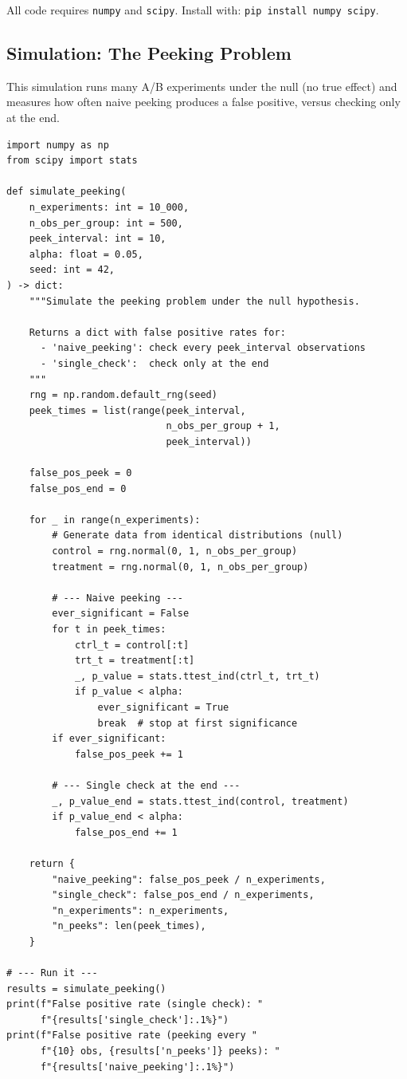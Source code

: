 \documentclass[12pt, a4paper]{article}
\begin{document}
All code requires \texttt{numpy} and \texttt{scipy}.  Install with:
\texttt{pip install numpy scipy}.


\subsection{Simulation: The Peeking Problem}

This simulation runs many A/B experiments under the null (no true effect)
and measures how often naive peeking produces a false positive, versus
checking only at the end.

\begin{lstlisting}
import numpy as np
from scipy import stats

def simulate_peeking(
    n_experiments: int = 10_000,
    n_obs_per_group: int = 500,
    peek_interval: int = 10,
    alpha: float = 0.05,
    seed: int = 42,
) -> dict:
    """Simulate the peeking problem under the null hypothesis.

    Returns a dict with false positive rates for:
      - 'naive_peeking': check every peek_interval observations
      - 'single_check':  check only at the end
    """
    rng = np.random.default_rng(seed)
    peek_times = list(range(peek_interval,
                            n_obs_per_group + 1,
                            peek_interval))

    false_pos_peek = 0
    false_pos_end = 0

    for _ in range(n_experiments):
        # Generate data from identical distributions (null)
        control = rng.normal(0, 1, n_obs_per_group)
        treatment = rng.normal(0, 1, n_obs_per_group)

        # --- Naive peeking ---
        ever_significant = False
        for t in peek_times:
            ctrl_t = control[:t]
            trt_t = treatment[:t]
            _, p_value = stats.ttest_ind(ctrl_t, trt_t)
            if p_value < alpha:
                ever_significant = True
                break  # stop at first significance
        if ever_significant:
            false_pos_peek += 1

        # --- Single check at the end ---
        _, p_value_end = stats.ttest_ind(control, treatment)
        if p_value_end < alpha:
            false_pos_end += 1

    return {
        "naive_peeking": false_pos_peek / n_experiments,
        "single_check": false_pos_end / n_experiments,
        "n_experiments": n_experiments,
        "n_peeks": len(peek_times),
    }

# --- Run it ---
results = simulate_peeking()
print(f"False positive rate (single check): "
      f"{results['single_check']:.1%}")
print(f"False positive rate (peeking every "
      f"{10} obs, {results['n_peeks']} peeks): "
      f"{results['naive_peeking']:.1%}")
\end{lstlisting}
\end{document}
